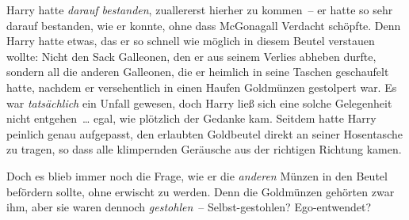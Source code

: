 Harry hatte \emph{darauf bestanden}, zuallererst hierher zu kommen – er hatte so sehr darauf bestanden, wie er konnte, ohne dass McGonagall Verdacht schöpfte. Denn Harry hatte etwas, das er so schnell wie möglich in diesem Beutel verstauen wollte: Nicht den Sack Galleonen, den er aus seinem Verlies abheben durfte, sondern all die anderen Galleonen, die er heimlich in seine Taschen geschaufelt hatte, nachdem er versehentlich in einen Haufen Goldmünzen gestolpert war. Es war \emph{tatsächlich} ein Unfall gewesen, doch Harry ließ sich eine solche Gelegenheit nicht entgehen … egal, wie plötzlich der Gedanke kam. Seitdem hatte Harry peinlich genau aufgepasst, den erlaubten Goldbeutel direkt an seiner Hosentasche zu tragen, so dass alle klimpernden Geräusche aus der richtigen Richtung kamen.

Doch es blieb immer noch die Frage, wie er die \emph{anderen} Münzen in den Beutel befördern sollte, ohne erwischt zu werden. Denn die Goldmünzen gehörten zwar ihm, aber sie waren dennoch \emph{gestohlen} – Selbst-gestohlen? Ego-entwendet?

